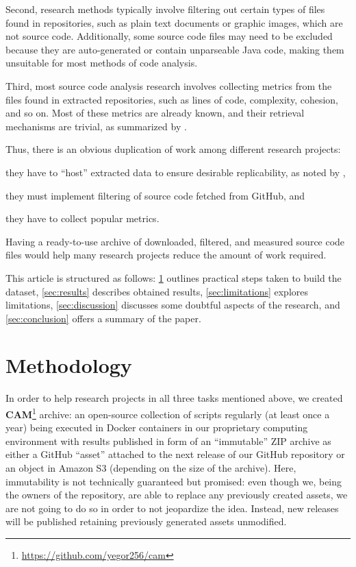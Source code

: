 \documentclass[sigplan,nonacm,review,anonymous]{acmart}
\newcommand\cam{{\sffamily\bfseries CAM}}
\begin{document}
Second, research methods typically involve filtering out certain types of files
found in repositories, such as plain text documents or graphic images, which
are not source code. Additionally, some source code files may need to be
excluded because they are auto-generated or contain unparseable Java code,
making them unsuitable for most methods of code analysis.

Third, most source code analysis research involves collecting metrics from the
files found in extracted repositories, such as lines of code, complexity,
cohesion, and so on. Most of these metrics are already known, and their
retrieval mechanisms are trivial, as summarized by \citet{nunez2017source}.

Thus, there is an obvious duplication of work among different research projects:
\begin{inparaenum}[(a)]
\item they have to ``host'' extracted data to ensure desirable replicability, as noted by \citet{7887704},
\item they must implement filtering of source code fetched from GitHub, and
\item they have to collect popular metrics.
\end{inparaenum}
Having a ready-to-use archive of downloaded, filtered, and measured source code files would help many research projects reduce the amount of work required.

This article is structured as follows:
\cref{sec:method} outlines practical steps taken to build the dataset,
\cref{sec:results} describes obtained results,
\cref{sec:limitations} explores limitations,
\cref{sec:discussion} discusses some doubtful aspects of the research,
and
\cref{sec:conclusion} offers a summary of the paper.

\section{Methodology}\label{sec:method}

In order to help research projects in all three tasks mentioned above, we
created \cam{}\footnote{\url{https://github.com/yegor256/cam}} archive: an
open-source collection of scripts regularly (at least once a year) being
executed in Docker containers in our proprietary computing environment with
results published in form of an ``immutable'' ZIP archive as either a GitHub
``asset'' attached to the next release of our GitHub repository or an object in
Amazon S3 (depending on the size of the archive). Here, immutability is not
technically guaranteed but promised: even though we, being the owners of the
repository, are able to replace any previously created assets, we are not going
to do so in order to not jeopardize the idea. Instead, new releases will be
published retaining previously generated assets unmodified.
\end{document}
